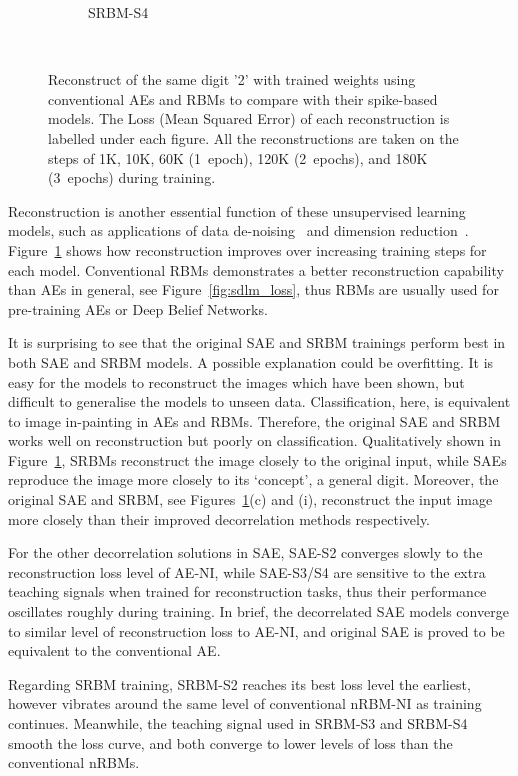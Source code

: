 \begin{figure}
\begin{subfigure}[t]{0.32\textwidth}
		\caption{SRBM-S4}
	\end{subfigure}\\
	\caption[Reconstructions of the same digit '2'.]{Reconstruct of the same digit '2' with trained weights using conventional AEs and RBMs to compare with their spike-based models.
		The Loss (Mean Squared Error) of each reconstruction is labelled under each figure.
		All the reconstructions are taken on the steps of 1K, 10K, 60K (1~epoch), 120K (2~epochs), and 180K (3~epochs) during training.}
	\label{fig:sdlm_recon}
\end{figure}

Reconstruction is another essential function of these unsupervised learning models, such as applications of data de-noising~\citep{xie2012image} and dimension reduction~\citep{hinton2006fast}.
Figure~\ref{fig:sdlm_recon} shows how reconstruction improves over increasing training steps for each model.
Conventional RBMs demonstrates a better reconstruction capability than AEs in general, see Figure~\ref{fig:sdlm_loss}, thus RBMs are usually used for pre-training AEs or Deep Belief Networks.

It is surprising to see that the original SAE and SRBM trainings perform best in both SAE and SRBM models.
A possible explanation could be overfitting.
It is easy for the models to reconstruct the images which have been shown, but difficult to generalise the models to unseen data.
Classification, here, is equivalent to image in-painting in AEs and RBMs.
Therefore, the original SAE and SRBM works well on reconstruction but poorly on classification.
Qualitatively shown in Figure~\ref{fig:sdlm_recon}, SRBMs reconstruct the image closely to the original input, while SAEs reproduce the image more closely to its `concept', a general digit.
Moreover, the original SAE and SRBM, see Figures~\ref{fig:sdlm_recon}(c) and (i), reconstruct the input image more closely than their improved decorrelation methods respectively.

For the other decorrelation solutions in SAE, 
SAE-S2 converges slowly to the reconstruction loss level of AE-NI, 
while SAE-S3/S4 are sensitive to the extra teaching signals when trained for reconstruction tasks, thus their performance oscillates roughly during training.
In brief, the decorrelated SAE models converge to similar level of reconstruction loss to AE-NI, and original SAE is proved to be equivalent to the conventional AE.

Regarding SRBM training, SRBM-S2 reaches its best loss level the earliest, however vibrates around the same level of conventional nRBM-NI as training continues.
Meanwhile, the teaching signal used in SRBM-S3 and SRBM-S4 smooth the loss curve, and both converge to lower levels of loss than the conventional nRBMs.

